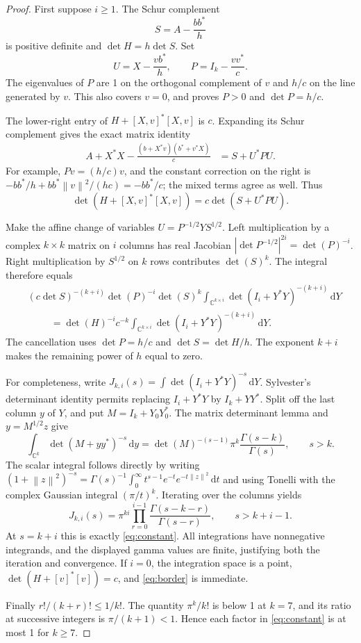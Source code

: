 \documentclass[11pt,letterpaper]{article}
\theoremstyle{remark}
\newcommand{\C}{\mathbb C}
\newcommand{\Id}{I}
\newcommand{\dd}{\,\mathrm d}
\newcommand{\norm}[1]{\left\lVert#1\right\rVert}
\newcommand{\abs}[1]{\left|#1\right|}
\begin{document}
\begin{proof}
First suppose $i\geq1$. The Schur complement
\[
 S=A-\frac{bb^*}{h}
\]
is positive definite and $\det H=h\det S$. Set
\[
 U=X-\frac{vb^*}{h},\qquad
 P=\Id_k-\frac{vv^*}{c}.
\]
The eigenvalues of $P$ are 1 on the orthogonal complement of $v$ and $h/c$ on
the line generated by $v$. This also covers $v=0$, and proves $P>0$ and
$\det P=h/c$.

The lower-right entry of $H+[X,v]^*[X,v]$ is $c$. Expanding its Schur complement
gives the exact matrix identity
\begin{align}
 A+X^*X-\frac{(b+X^*v)(b^*+v^*X)}{c}
 &=S+U^*PU.\label{eq:completion}
\end{align}
For example, $Pv=(h/c)v$, and the constant correction on the right is
$-bb^*/h+bb^*\norm v^2/(hc)=-bb^*/c$; the mixed terms agree as well.
Thus
\begin{equation}\label{eq:schurdet}
 \det(H+[X,v]^*[X,v])=c\det(S+U^*PU).
\end{equation}

Make the affine change of variables
$U=P^{-1/2}YS^{1/2}$. Left multiplication by a complex $k\times k$ matrix on
$i$ columns has real Jacobian $\abs{\det P^{-1/2}}^{2i}=\det(P)^{-i}$.
Right multiplication by $S^{1/2}$ on $k$ rows contributes $\det(S)^k$.
The integral therefore equals
\begin{align*}
 &(c\det S)^{-(k+i)}\det(P)^{-i}\det(S)^k
 \int_{\C^{k\times i}}\det(\Id_i+Y^*Y)^{-(k+i)}\dd Y\\
 &\hspace{1cm}=\det(H)^{-i}c^{-k}
 \int_{\C^{k\times i}}\det(\Id_i+Y^*Y)^{-(k+i)}\dd Y.
\end{align*}
The cancellation uses $\det P=h/c$ and $\det S=\det H/h$. The exponent
$k+i$ makes the remaining power of $h$ equal to zero.

For completeness, write
$J_{k,i}(s)=\int\det(\Id_i+Y^*Y)^{-s}\dd Y$.
Sylvester's determinant identity permits replacing $\Id_i+Y^*Y$ by
$\Id_k+YY^*$. Split off the last column $y$ of $Y$, and put
$M=\Id_k+Y_0Y_0^*$. The matrix determinant lemma and $y=M^{1/2}z$ give
\[
 \int_{\C^k}\det(M+yy^*)^{-s}\dd y
 =\det(M)^{-(s-1)}\pi^k\frac{\Gamma(s-k)}{\Gamma(s)},\qquad s>k.
\]
The scalar integral follows directly by writing
$(1+\norm z^2)^{-s}=\Gamma(s)^{-1}
\int_0^\infty t^{s-1}e^{-t}e^{-t\norm z^2}\dd t$ and using Tonelli with the
complex Gaussian integral $(\pi/t)^k$. Iterating over the columns yields
\[
 J_{k,i}(s)=\pi^{ki}\prod_{r=0}^{i-1}
 \frac{\Gamma(s-k-r)}{\Gamma(s-r)},\qquad s>k+i-1.
\]
At $s=k+i$ this is exactly \eqref{eq:constant}. All integrations have
nonnegative integrands, and the displayed gamma values are finite, justifying
both the iteration and convergence. If $i=0$, the integration space is a point,
$\det(H+[v]^*[v])=c$, and \eqref{eq:border} is immediate.

Finally $r!/(k+r)!\leq1/k!$. The quantity $\pi^k/k!$ is below 1 at $k=7$,
and its ratio at successive integers is $\pi/(k+1)<1$. Hence each factor in
\eqref{eq:constant} is at most 1 for $k\geq7$.
\end{proof}
\end{document}
